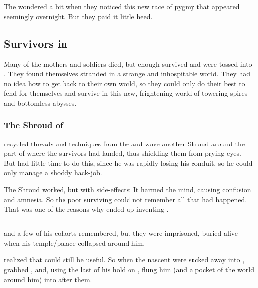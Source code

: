 The \dragons{} wondered a bit when they noticed this new race of pygmy \nephilim{} that appeared seemingly overnight. 
But they paid it little heed.









\subsection{Survivors in \Nyx}
Many of the mothers and soldiers died, but enough survived and were tossed into \Nyx. 
They found themselves stranded in a strange and inhospitable world. 
They had no idea how to get back to their own world, so they could only do their best to fend for themselves and survive in this new, frightening world of towering spires and bottomless abysses. 





\subsubsection{The Shroud of \Nyx}
\Daggerrain{} recycled threads and techniques from the  and wove another Shroud around the part of \Nyx{} where the survivors had landed, thus shielding them from prying \draconian{} eyes. 
But \Daggerrain{} had little time to do this, since he was rapidly losing his conduit, so he could only manage a shoddy hack-job. 

The Shroud worked, but with side-effects: 
It harmed the mind, causing confusion and amnesia. 
So the poor surviving \nephilim{} could not remember all that had happened. 
That was one of the reasons why \Merkyrah{} ended up inventing . 










\subsection{\Semiza}
\Semiza{} and a few of his cohorts remembered, but they were imprisoned, buried alive when his temple/palace collapsed around him. 

\Daggerrain{} realized that \Semiza{} could still be useful. 
So when the nascent \resphain{} were sucked away into \Nyx{}, \Daggerrain{} grabbed \Semiza, and, using the last of his hold on \Tembrae, flung him (and a pocket of the world around him) into \Nyx{} after them. 

